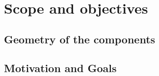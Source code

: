 \section{Scope and objectives}
\subsection{Geometry of the components}

\newpage

\subsection{Motivation and Goals}

\newpage
